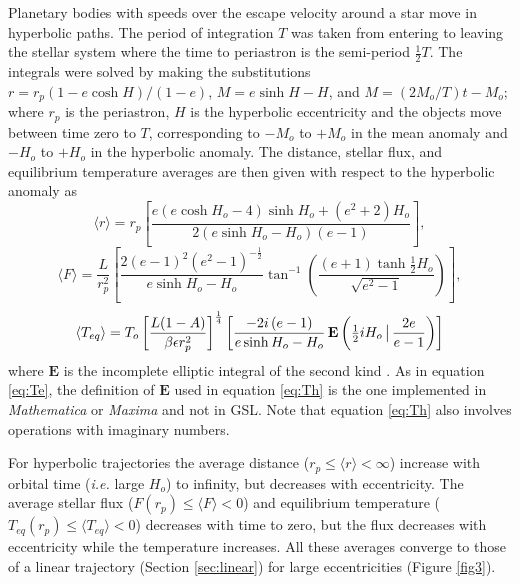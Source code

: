 \documentclass[a4paper,fleqn,usenatbib]{mnras}
\begin{document}
Planetary bodies with speeds over the escape velocity around a star move in hyperbolic paths. The period of integration $T$ was taken from entering to leaving the stellar system where the time to periastron is the semi-period $\frac{1}{2}T$. The integrals were solved by making the substitutions $r=r_p(1-e\cosh{H})/(1-e)$, $M=e\sinh{H} - H$, and $M=(2M_o/T)t - M_o$; where $r_p$ is the periastron, $H$ is the hyperbolic eccentricity and the objects move between time zero to $T$, corresponding to $-M_o$ to $+M_o$ in the mean anomaly and $-H_o$ to $+H_o$ in the hyperbolic anomaly. The distance, stellar flux, and equilibrium temperature averages are then given with respect to the hyperbolic anomaly as
\begin{equation} \label{eq:rh}
\langle r \rangle = r_p \left[\frac{e \left(e \cosh{H_o} - 4\right) \sinh{H_o} + \left(e^{2} + 2\right) H_o}{2\left(e \sinh{H_o} - H_o\right) \left( e-1 \right) } \right],
\end{equation}
\begin{equation} \label{eq:Fh}
\langle F \rangle = \frac{L}{r_p^2} \left[ \frac{2 \left( e - 1 \right)^2 \left(e^2 - 1\right)^{-\frac{1}{2}}}{e \sinh{H_o} - H_o}\tan^{-1}\left({\frac{\left(e + 1\right) \tanh{\frac{1}{2}H_o}}{\sqrt{e^2 - 1}}}\right) \right],
\end{equation}
\begin{equation} \label{eq:Th}
\langle T_{eq} \rangle = T_o \left[\frac{L {\left(1 - A\right)}}{\beta \epsilon r_p^{2}}\right]^{\frac{1}{4}} \left[ \frac{-2 i \left(e-1\right)}{e \sinh{H_o} - H_o} \, {\rm \mathbf{E}}\left(\tfrac{1}{2}iH_o \, \big| \, \frac{2e}{e - 1}\right) \right]
\end{equation}
where $\mathbf{E}$ is the incomplete elliptic integral of the second kind \citep{MathWorld, GSL}. As in equation \ref{eq:Te}, the definition of $\mathbf{E}$ used in equation \ref{eq:Th} is the one implemented in \emph{Mathematica} or \emph{Maxima} and not in GSL. Note that equation \ref{eq:Th} also involves operations with imaginary numbers.

For hyperbolic trajectories the average distance ($r_p \leq \langle r \rangle < \infty$) increase with orbital time (\emph{i.e.} large $H_o$) to infinity, but decreases with eccentricity. The average stellar flux ($F(r_p) \leq \langle F \rangle < 0$) and equilibrium temperature ($T_{eq}(r_p) \leq \langle T_{eq} \rangle < 0$) decreases with time to zero, but the flux decreases with eccentricity while the temperature increases. All these averages converge to those of a linear trajectory (Section \ref{sec:linear}) for large eccentricities (Figure \ref{fig3}).
\end{document}
